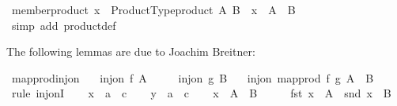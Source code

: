 \begin{isabellebody}
\isanewline
{}\isamarkupfalse%
\ member{\isacharunderscore}{\kern0pt}product{\isacharcolon}{\kern0pt}\ {\isachardoublequoteopen}x\ {\isasymin}\ Product{\isacharunderscore}{\kern0pt}Type{\isachardot}{\kern0pt}product\ A\ B\ {\isasymlongleftrightarrow}\ x\ {\isasymin}\ A\ {\isasymtimes}\ B{\isachardoublequoteclose}\isanewline
%
\isadelimproof
\ \ %
\endisadelimproof
%
\isatagproof
{}\isamarkupfalse%
\ {\isacharparenleft}{\kern0pt}simp\ add{\isacharcolon}{\kern0pt}\ product{\isacharunderscore}{\kern0pt}def{\isacharparenright}{\kern0pt}%
\endisatagproof
{\isafoldproof}%
%
\isadelimproof
\isanewline
%
\endisadelimproof
\isanewline
{}\isamarkupfalse%
%
\begin{isamarkuptext}%
The following  lemmas are due to Joachim Breitner:%
\end{isamarkuptext}\isamarkuptrue%
\isamarkupfalse%
\ map{\isacharunderscore}{\kern0pt}prod{\isacharunderscore}{\kern0pt}inj{\isacharunderscore}{\kern0pt}on{\isacharcolon}{\kern0pt}\isanewline
\ \ \ {\isachardoublequoteopen}inj{\isacharunderscore}{\kern0pt}on\ f\ A{\isachardoublequoteclose}\isanewline
\ \ \ \ \ {\isachardoublequoteopen}inj{\isacharunderscore}{\kern0pt}on\ g\ B{\isachardoublequoteclose}\isanewline
\ \ \ {\isachardoublequoteopen}inj{\isacharunderscore}{\kern0pt}on\ {\isacharparenleft}{\kern0pt}map{\isacharunderscore}{\kern0pt}prod\ f\ g{\isacharparenright}{\kern0pt}\ {\isacharparenleft}{\kern0pt}A\ {\isasymtimes}\ B{\isacharparenright}{\kern0pt}{\isachardoublequoteclose}\isanewline
%
\isadelimproof
%
\endisadelimproof
%
\isatagproof
{}\isamarkupfalse%
\ {\isacharparenleft}{\kern0pt}rule\ inj{\isacharunderscore}{\kern0pt}onI{\isacharparenright}{\kern0pt}\isanewline
\ \ \isamarkupfalse%
\ x\ {\isacharcolon}{\kern0pt}{\isacharcolon}{\kern0pt}\ {\isachardoublequoteopen}{\isacharprime}{\kern0pt}a\ {\isasymtimes}\ {\isacharprime}{\kern0pt}c{\isachardoublequoteclose}\isanewline
\ \ \isamarkupfalse%
\ y\ {\isacharcolon}{\kern0pt}{\isacharcolon}{\kern0pt}\ {\isachardoublequoteopen}{\isacharprime}{\kern0pt}a\ {\isasymtimes}\ {\isacharprime}{\kern0pt}c{\isachardoublequoteclose}\isanewline
\ \ \isamarkupfalse%
\ {\isachardoublequoteopen}x\ {\isasymin}\ A\ {\isasymtimes}\ B{\isachardoublequoteclose}\isanewline
\ \ \isamarkupfalse%
\ \isamarkupfalse%
\ {\isachardoublequoteopen}fst\ x\ {\isasymin}\ A{\isachardoublequoteclose}\ \ {\isachardoublequoteopen}snd\ x\ {\isasymin}\ B{\isachardoublequoteclose}\ \isamarkupfalse%

\end{isabellebody}
